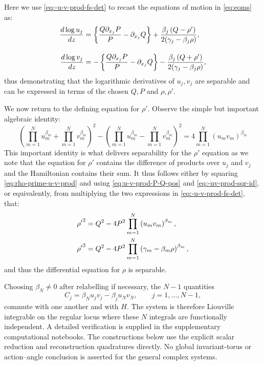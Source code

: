 \documentclass[11pt,a4paper]{article}
\numberwithin{equation}{section}
\begin{document}
Here we use \eqref{eq:-u-v-prod-fs-det} to recast the equations of motion in \eqref{eq:eoms} as:
\begin{align}
    \frac{d \log{u_j}}{dz} &= \left\{\frac{Q \partial_{x_j} P}{P} - \partial_{x_j} Q \right\} + \frac{\beta_j \left(Q - \rho'\right)}{2 (\gamma_j - \beta_j \rho)}, \notag \\[10pt]
    \frac{d \log{v_j}}{dz} &= -\left\{\frac{Q \partial_{x_j} P}{P} - \partial_{x_j} Q \right\} - \frac{\beta_j \left(Q + \rho'\right)}{2 (\gamma_j - \beta_j \rho)}, \label{eq:eoms-rho-only}
\end{align}
thus demonstrating that the logarithmic derivatives of $u_j, v_j$ are separable and can be expressed in terms of the chosen $Q, P$ and $\rho, \rho'$.

We now return to the defining equation for $\rho'$. Observe the simple but important algebraic identity:
\begin{equation}
    \left(\prod_{m=1}^{N} u_{m}^{{\beta}_{m}} + \prod_{m=1}^{N} v_{m}^{{\beta}_{m}}\right)^2 -  \left(\prod_{m=1}^{N} u_{m}^{{\beta}_{m}} - \prod_{m=1}^{N} v_{m}^{{\beta}_{m}}\right)^2 = 4\prod_{m=1}^{N} \left(u_{m}v_m\right)^{{\beta}_{m}} \label{eq:-uv-prod-sqr-id}
\end{equation}
This important identity is what delivers separability for the $\rho'$ equation as we note that the equation for $\rho'$ contains the difference of products over $u_j$ and $v_j$ and the Hamiltonian contains their sum. 
It thus follows either by squaring \eqref{eq:rho-prime-u-v-prod} and using \eqref{eq:u-v-prod-P-Q-pos} and \eqref{eq:-uv-prod-sqr-id}, or equivalently, from multiplying the two expressions in \eqref{eq:-u-v-prod-fs-det}, that:
\begin{align}
    \label{eq:drho-sqrd-ham}
    {\rho'}^2 &= Q^2 - 4P^2 \prod_{m=1}^{N} \left(u_{m}v_m\right)^{{\beta}_{m}}, \notag \\
    {\rho'}^2 &= Q^2 - 4P^2 \prod_{m=1}^{N} \left(\gamma_m - \beta_m \rho\right)^{{\beta}_{m}},
\end{align}
and thus the differential equation for $\rho$ is separable. 

Choosing $\beta_N\ne0$ after relabelling if necessary, the $N-1$ quantities
\begin{equation}
    C_j=\beta_Nu_jv_j-\beta_ju_Nv_N,\qquad j=1,\ldots,N-1,
\end{equation}
commute with one another and with $H$. The system is therefore Liouville integrable on the regular locus where these $N$ integrals are functionally independent. A detailed verification is supplied in the supplementary computational notebooks. The constructions below use the explicit scalar reduction and reconstruction quadratures directly. No global invariant-torus or action--angle conclusion is asserted for the general complex systems.
\end{document}
